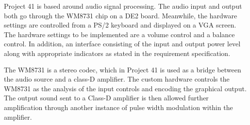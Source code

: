 Project 41 is based around audio signal processing. The audio input and output both go through the WM8731 chip on a DE2 board. Meanwhile, the hardware settings are controlled from a PS/2 keyboard and displayed on a VGA screen. The hardware settings to be implemented are a volume control and a balance control. In addition, an interface consisting of the input and output power level along with appropriate indicators as stated in the requirement specification.

The WM8731 is a stereo codec, which in Project 41 is used as a bridge between the audio source and a class-D amplifier. The custom hardware controls the WM8731 as the analysis of the input controls and encoding the graphical output. The output sound sent to a Class-D amplifier is then allowed further amplification through another instance of pulse width modulation within the amplifier.

